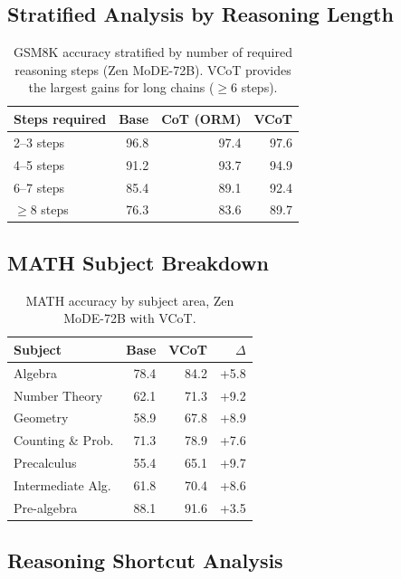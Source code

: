 \documentclass[11pt,a4paper]{article}
\begin{document}
\subsection{Stratified Analysis by Reasoning Length}

\begin{table}[H]
\centering
\caption{GSM8K accuracy stratified by number of required reasoning steps (Zen MoDE-72B).
VCoT provides the largest gains for long chains ($\geq$6 steps).}
\begin{tabular}{lrrr}
\toprule
\textbf{Steps required} & \textbf{Base} & \textbf{CoT (ORM)} & \textbf{VCoT} \\
\midrule
2--3 steps  & 96.8 & 97.4 & 97.6 \\
4--5 steps  & 91.2 & 93.7 & 94.9 \\
6--7 steps  & 85.4 & 89.1 & 92.4 \\
$\geq$8 steps & 76.3 & 83.6 & 89.7 \\
\bottomrule
\end{tabular}
\label{tab:length_strat}
\end{table}

\subsection{MATH Subject Breakdown}

\begin{table}[H]
\centering
\caption{MATH accuracy by subject area, Zen MoDE-72B with VCoT.}
\begin{tabular}{lrrr}
\toprule
\textbf{Subject} & \textbf{Base} & \textbf{VCoT} & \textbf{$\Delta$} \\
\midrule
Algebra          & 78.4 & 84.2 & +5.8 \\
Number Theory    & 62.1 & 71.3 & +9.2 \\
Geometry         & 58.9 & 67.8 & +8.9 \\
Counting \& Prob.& 71.3 & 78.9 & +7.6 \\
Precalculus      & 55.4 & 65.1 & +9.7 \\
Intermediate Alg.& 61.8 & 70.4 & +8.6 \\
Pre-algebra      & 88.1 & 91.6 & +3.5 \\
\bottomrule
\end{tabular}
\label{tab:math_subject}
\end{table}

\subsection{Reasoning Shortcut Analysis}
\end{document}
